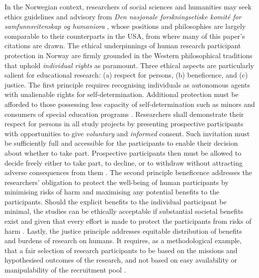 \documentclass[
        a4paper, %
        12pt, %
        stu, %
        noextraspace, %
        floatsintext, %
        biblatex, %
        twoside, %
        colorlinks=true,        %
        linkcolor=red,          %
        anchorcolor=red,      %
        citecolor=blue,         %
        urlcolor=blue,          %
        bookmarks=true,         %
        bookmarksopen=false,    %
        bookmarksnumbered=true,  %
        dvipsnames
]{apa7}
\begin{document}
In the Norwegian context, researchers of social sciences and humanities may seek ethics guidelines and advisory from \textit{Den nasjonale forskningsetiske komit{\'e} for samfunnsvitenskap og humaniora} \parencite{nesh:2018}, whose positions and philosophies are largely comparable to their counterparts in the USA, from where many of this paper's citations are drawn. The ethical underpinnings of human research participant protection in Norway are firmly grounded in the Western philosophical traditions that uphold \emph{individual rights} as paramount. Three ethical aspects are particularly salient for educational research: (a) respect for persons, (b) beneficence, and (c) justice. The first principle requires recognising individuals as autonomous agents with unalienable rights for self-determination. Additional protection must be afforded to those possessing less capacity of self-determination such as minors and consumers of special education programs \parencite{ross:2018}. Researchers shall demonstrate their respect for persons in all study projects by presenting prospective participants with opportunities to give \emph{voluntary} and \emph{informed} consent. Such invitation must be sufficiently full and accessible for the participants to enable their decision about whether to take part. Prospective participants then must be allowed to decide freely either to take part, to decline, or to withdraw without attracting adverse consequences from them \parencite{crow:2006}. The second principle beneficence addresses the researchers' obligation to protect the well-being of human participants by minimising risks of harm and maximising any potential benefits to the participants. Should the explicit benefits to the individual participant be minimal, the studies can be ethically acceptable if substantial societal benefits exist and given that every effort is made to protect the participants from risks of harm \parencite{ross:2018}. Lastly, the justice principle addresses equitable distribution of benefits and burdens of research on humans. It requires, as a methodological example, that a fair selection of research participants to be based on the missions and hypothesised outcomes of the research, and not based on easy availability or manipulability of the recruitment pool \parencite{ross:2018}.
\end{document}
